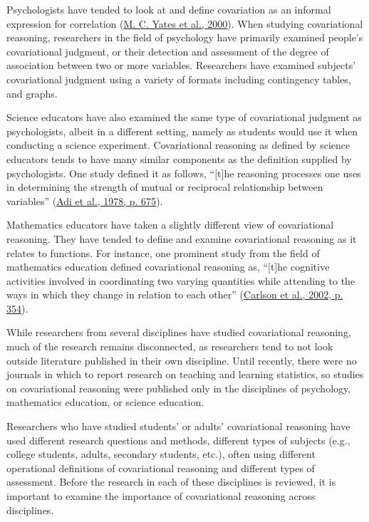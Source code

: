 \documentclass[11pt]{umnthesis}
\begin{document}
Psychologists have tended to look at and define covariation as an informal expression for correlation (\protect\hyperlink{ref-yates:2000}{M. C. Yates et al., 2000}). When studying covariational reasoning, researchers in the field of psychology have primarily examined people's covariational judgment, or their detection and assessment of the degree of association between two or more variables. Researchers have examined subjects' covariational judgment using a variety of formats including contingency tables, and graphs.

Science educators have also examined the same type of covariational judgment as psychologists, albeit in a different setting, namely as students would use it when conducting a science experiment. Covariational reasoning as defined by science educators tends to have many similar components as the definition supplied by psychologists. One study defined it as follows, ``{[}t{]}he reasoning processes one uses in determining the strength of mutual or reciprocal relationship between variables'' (\protect\hyperlink{ref-adi:1978}{Adi et al., 1978, p. 675}).

Mathematics educators have taken a slightly different view of covariational reasoning. They have tended to define and examine covariational reasoning as it relates to functions. For instance, one prominent study from the field of mathematics education defined covariational reasoning as, ``{[}t{]}he cognitive activities involved in coordinating two varying quantities while attending to the ways in which they change in relation to each other'' (\protect\hyperlink{ref-carlson:2002}{Carlson et al., 2002, p. 354}).

While researchers from several disciplines have studied covariational reasoning, much of the research remains disconnected, as researchers tend to not look outside literature published in their own discipline. Until recently, there were no journals in which to report research on teaching and learning statistics, so studies on covariational reasoning were published only in the disciplines of psychology, mathematics education, or science education.

Researchers who have studied students' or adults' covariational reasoning have used different research questions and methods, different types of subjects (e.g., college students, adults, secondary students, etc.), often using different operational definitions of covariational reasoning and different types of assessment. Before the research in each of these disciplines is reviewed, it is important to examine the importance of covariational reasoning across disciplines.
\end{document}
